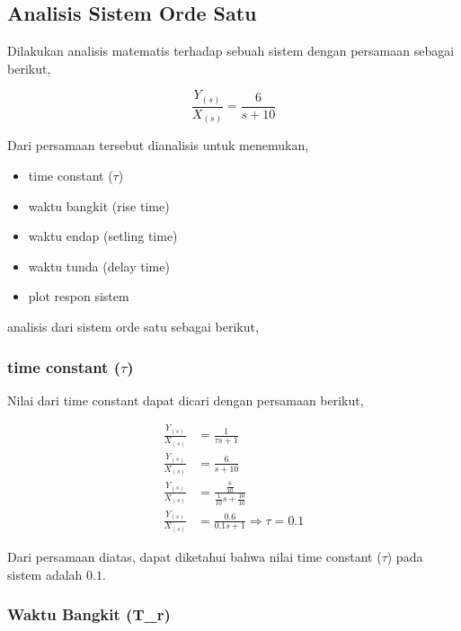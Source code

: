 \documentclass[../laporan]{subfiles}
\begin{document}
\subsection{Analisis Sistem Orde Satu}

Dilakukan analisis matematis terhadap sebuah sistem dengan persamaan sebagai berikut,

\begin{equation*}
    \frac{Y_{(s)}}{X_{(s)}} = \frac{6}{s+10}
\end{equation*}

Dari persamaan tersebut dianalisis untuk menemukan,

\begin{itemize}
    \item time constant ($\tau$)
    \item waktu bangkit (rise time)
    \item waktu endap (setling time)
    \item waktu tunda (delay time)
    \item plot respon sistem
\end{itemize}

analisis dari sistem orde satu sebagai berikut,

\subsubsection{time constant ($\tau$)}

Nilai dari time constant dapat dicari dengan persamaan berikut,

\begin{equation}
\begin{split}
    \frac{Y_{(s)}}{X_{(s)}} &= \frac{1}{\tau s+1} \\[5pt]
    \frac{Y_{(s)}}{X_{(s)}} &= \frac{6}{s+10}\\[5pt]
    \frac{Y_{(s)}}{X_{(s)}} &= \frac{\frac{6}{10}}{\frac{1}{10}s+\frac{10}{10}}\\[5pt]
    \frac{Y_{(s)}}{X_{(s)}} &= \frac{0.6}{0.1s+1} \Rightarrow \tau = 0.1
\end{split}
\end{equation}

Dari persamaan diatas, dapat diketahui bahwa nilai time constant ($ \tau $) pada sistem adalah $ 0.1 $.



\subsubsection{Waktu Bangkit (T_r)}
\end{document}
